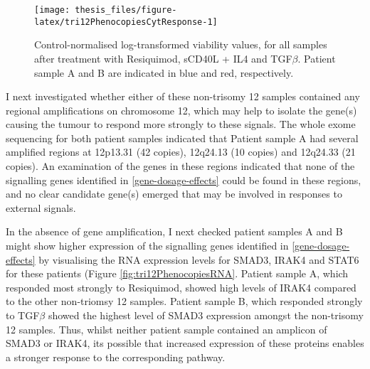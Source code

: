 \documentclass[11pt, a4paper, twosided]{book}
\begin{document}
\begin{figure}

{\centering \texttt{[image: thesis\_files/figure-latex/tri12PhenocopiesCytResponse-1]} 

}

\caption{Control-normalised log-transformed viability values, for all samples after treatment with Resiquimod, sCD40L + IL4 and TGF\(\beta\). Patient sample A and B are indicated in blue and red, respectively.}\label{fig:tri12PhenocopiesCytResponse}
\end{figure}
I next investigated whether either of these non-trisomy 12 samples contained any regional amplifications on chromosome 12, which may help to isolate the gene(s) causing the tumour to respond more strongly to these signals. The whole exome sequencing for both patient samples indicated that Patient sample A had several amplified regions at 12p13.31 (42 copies), 12q24.13 (10 copies) and 12q24.33 (21 copies). An examination of the genes in these regions indicated that none of the signalling genes identified in \ref{gene-dosage-effects} could be found in these regions, and no clear candidate gene(s) emerged that may be involved in responses to external signals.

In the absence of gene amplification, I next checked patient samples A and B might show higher expression of the signalling genes identified in \ref{gene-dosage-effects} by visualising the RNA expression levels for SMAD3, IRAK4 and STAT6 for these patients (Figure \ref{fig:tri12PhenocopiesRNA}. Patient sample A, which responded most strongly to Resiquimod, showed high levels of IRAK4 compared to the other non-triomsy 12 samples. Patient sample B, which responded strongly to TGF\(\beta\) showed the highest level of SMAD3 expression amongst the non-trisomy 12 samples. Thus, whilst neither patient sample contained an amplicon of SMAD3 or IRAK4, its possible that increased expression of these proteins enables a stronger response to the corresponding pathway.
\end{document}
